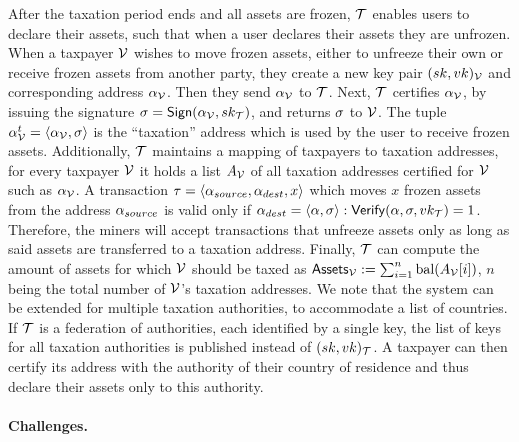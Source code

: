 After the taxation period ends and all assets are frozen, $\mathcal{T}$ enables
users to declare their assets, such that when a user declares their assets
they are unfrozen. When a taxpayer $\mathcal{V}$ wishes to move frozen assets, \ie
either to unfreeze their own or receive frozen assets from another party, they
create a new key pair $(sk, vk)_\mathcal{V}$ and corresponding address
$\alpha_\mathcal{V}$. Then they send $\alpha_\mathcal{V}$ to $\mathcal{T}$. Next,
$\mathcal{T}$ certifies $\alpha_\mathcal{V}$, by issuing the signature $\sigma =
\mathsf{Sign}(\alpha_\mathcal{V}, sk_\mathcal{T})$, and returns $\sigma$ to $\mathcal{V}$.
The tuple $\alpha_\mathcal{V}^{t} = \langle \alpha_\mathcal{V}, \sigma \rangle$ is the
``taxation'' address which is used by the user to receive frozen assets.
Additionally, $\mathcal{T}$ maintains a mapping of taxpayers to taxation
addresses, \ie for every taxpayer $\mathcal{V}$ it holds a list $A_\mathcal{V}$ of all
taxation addresses certified for $\mathcal{V}$ such as $\alpha_\mathcal{V}$.
A transaction $\tau = \langle \alpha_{source}, \alpha_{dest}, x \rangle$
which moves $x$ frozen assets from the address $\alpha_{source}$ is valid
only if $\alpha_{dest} = \langle \alpha, \sigma \rangle:
\mathsf{Verify}(\alpha, \sigma, vk_\mathcal{T}) = 1$. Therefore, the miners
will accept transactions that unfreeze assets only as long as said assets are
transferred to a taxation address.
Finally, $\mathcal{T}$ can compute the amount of assets for which $\mathcal{V}$ should
be taxed as $\mathsf{Assets}_\mathcal{V} := \sum_{i=1}^{n} \text{bal}(A_{\mathcal{V}}[i])$,
$n$ being the total number of $\mathcal{V}$'s taxation addresses. We note that the
system can be extended for multiple taxation authorities, \eg to accommodate a
list of countries. If $\mathcal{T}$ is a federation of authorities, each
identified by a single key, the list of keys for all taxation authorities is
published instead of $(sk, vk)_\mathcal{T}$. A taxpayer can then certify its
address with the authority of their country of residence and thus declare their
assets only to this authority.

\paragraph{Challenges.}

